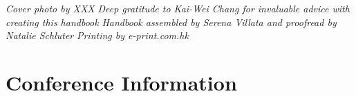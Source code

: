 \documentclass[twoside,makeidx]{book}
\begin{document}





\thispagestyle{empty}
\vspace*{6in}
\begin{linez}
\emph{Cover photo by \textcopyright XXX}
\emph{Deep gratitude to Kai-Wei Chang for invaluable advice with creating this handbook}
    \emph{Handbook assembled by Serena Villata and proofread by Natalie Schluter}
\emph{Printing by e-print.com.hk}
\end{linez}

%

\frontmatter

\setcounter{tocdepth}{2}
\tableofcontents
\mainmatter

\chapter{Conference Information}

\clearpage


\clearpage%
\setheaders{}{}


\clearpage%
\setheaders{}{}

%



\cleardoublepage


\end{document}
